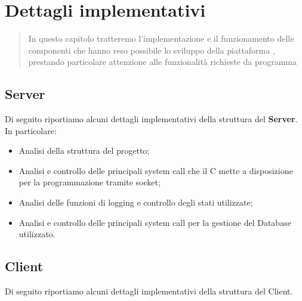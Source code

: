 \chapter{Dettagli implementativi}
  \begin{abstract}
    In questo capitolo tratteremo l'implementazione e il funzionamento delle componenti che hanno reso possibile lo sviluppo della piattaforma , prestando particolare attenzione alle funzionalità richieste da programma
  \end{abstract}
  \section{Server}
    Di seguito riportiamo alcuni dettagli implementativi della struttura del \textbf{Server}. In particolare:

    \begin{itemize}
      \item Analisi della struttura del progetto;
      \item Analisi e controllo delle principali system call che il C mette a disposizione per la programmazione tramite socket\footnotemark; 
      \item Analisi delle funzioni di logging e controllo degli stati utilizzate;
      \item Analisi e controllo delle principali system call per la gestione del Database utilizzato.
    \end{itemize}

    \newpage
  \section{Client}
    Di seguito riportiamo alcuni dettagli implementativi della struttura del Client.
    \newpage
